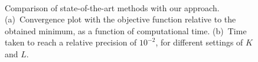 \begin{figure}[t]
    \centering
      \\
    \caption[Comparison of state-of-the-art methods with our approach.]{Comparison of state-of-the-art methods with our approach. (a)~Convergence plot with the objective function relative to the obtained minimum, as a function of computational time. (b)~Time taken to reach a relative precision of $10^{-2}$, for different settings of $K$ and $L$.  }
    \label{fig:sommaire:convergence}
\end{figure}

